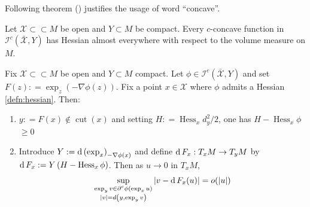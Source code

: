 Following theorem (\cite[Proposition 3.4]{cordero2001riemannian}) justifies the usage of word ``concave''.
\begin{thm}
	\label{thm:c-concave_hessain}
	Let $\mathcal{X} \subset \subset M$ be open and $Y \subset M$ be compact.
	Every $c$-concave function in $\mathcal{I}^c(\bar { \mathcal{X}}, Y )$ has Hessian
	almost everywhere with respect to the volume measure on $M$.
\end{thm}

\begin{prop} 
	\label{prop:differentiate_optimal_transport}
	Fix \( \mathcal{X} \subset \subset M \) be open and \( Y \subset M \) compact.
	Let \( \phi \in \mathcal{I} ^ { c } ( \bar { \mathcal{X} } , Y ) \) and set \( F ( z ) : = \exp _ { z } ( - \nabla \phi ( z ) ) . \)
	Fix a point \( x \in \mathcal{X} \) where \( \phi \) admits a Hessian \cref{defn:hessian}.
	Then:
	\begin{enumerate}
		\item \( y : = F ( x ) \notin \operatorname { cut } ( x ) \) and setting \( H : = \operatorname { Hess } _ { x } d _ { y } ^ { 2 } / 2 \), one has \( H - \operatorname { Hess } _ { x } \phi \) \( \geq 0 \)
		\item Introduce \( Y : = \operatorname{d} \left( \exp _ { x } \right) _ { - \nabla \phi ( x ) } \) and define \( \operatorname{d} F _ { x } : T _ { x } M \rightarrow T _ { y } M \) by
		      \( \operatorname{d} F _ { x } : = Y \left( H - \operatorname { Hess } _ { x } \phi \right) \).
		      Then as \( u \rightarrow 0 \) in \( T _ { x } M \),
		      \begin{equation}
			      \label{equa:differentiate_optimal_transport}
			      \sup _ {\substack {\exp _ { y } v \in \partial ^ { c } \phi \left( \exp _ { x } u \right) \\
					      | v | = d \left( y , \exp _ { y } v \right)} } \left| v - \operatorname{d} F _ { x } ( u ) \right| = o ( | u | )
		      \end{equation}

	\end{enumerate}
\end{prop}

